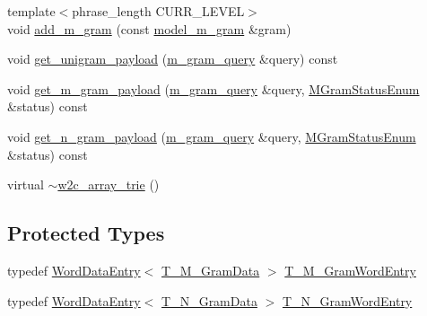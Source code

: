 \begin{DoxyCompactItemize}
\item 
{\footnotesize template$<$phrase\+\_\+length C\+U\+R\+R\+\_\+\+L\+E\+V\+E\+L$>$ }\\void \hyperlink{classuva_1_1smt_1_1bpbd_1_1server_1_1lm_1_1w2c__array__trie_aab00f9dd930f06aa41d71fa431518f5e}{add\+\_\+m\+\_\+gram} (const \hyperlink{classuva_1_1smt_1_1bpbd_1_1server_1_1lm_1_1m__grams_1_1model__m__gram}{model\+\_\+m\+\_\+gram} \&gram)
\item 
void \hyperlink{classuva_1_1smt_1_1bpbd_1_1server_1_1lm_1_1w2c__array__trie_a3c53de697d10118522efc9ef5b200d60}{get\+\_\+unigram\+\_\+payload} (\hyperlink{classuva_1_1smt_1_1bpbd_1_1server_1_1lm_1_1m__gram__query}{m\+\_\+gram\+\_\+query} \&query) const 
\item 
void \hyperlink{classuva_1_1smt_1_1bpbd_1_1server_1_1lm_1_1w2c__array__trie_ae0c12872fd7d55a68452da23bd63966f}{get\+\_\+m\+\_\+gram\+\_\+payload} (\hyperlink{classuva_1_1smt_1_1bpbd_1_1server_1_1lm_1_1m__gram__query}{m\+\_\+gram\+\_\+query} \&query, \hyperlink{namespaceuva_1_1smt_1_1bpbd_1_1server_1_1lm_ab9b3e7382b561dcb8abcd6b55e9b796a}{M\+Gram\+Status\+Enum} \&status) const 
\item 
void \hyperlink{classuva_1_1smt_1_1bpbd_1_1server_1_1lm_1_1w2c__array__trie_a98d42527dd09acc688effad51a0dba6a}{get\+\_\+n\+\_\+gram\+\_\+payload} (\hyperlink{classuva_1_1smt_1_1bpbd_1_1server_1_1lm_1_1m__gram__query}{m\+\_\+gram\+\_\+query} \&query, \hyperlink{namespaceuva_1_1smt_1_1bpbd_1_1server_1_1lm_ab9b3e7382b561dcb8abcd6b55e9b796a}{M\+Gram\+Status\+Enum} \&status) const 
\item 
virtual \hyperlink{classuva_1_1smt_1_1bpbd_1_1server_1_1lm_1_1w2c__array__trie_a52711a1b50dbe1b1bde4308ab03c3c89}{$\sim$w2c\+\_\+array\+\_\+trie} ()
\end{DoxyCompactItemize}
\subsection*{Protected Types}
\begin{DoxyCompactItemize}
\item 
typedef \hyperlink{classuva_1_1smt_1_1bpbd_1_1server_1_1lm_1_1w2c__array__trie_1_1_word_data_entry}{Word\+Data\+Entry}$<$ \hyperlink{namespaceuva_1_1smt_1_1bpbd_1_1server_1_1lm_1_1_____w2_c_array_trie_a4d413639b142daeda71cdadbf01c2b87}{T\+\_\+\+M\+\_\+\+Gram\+Data} $>$ \hyperlink{classuva_1_1smt_1_1bpbd_1_1server_1_1lm_1_1w2c__array__trie_a9b8413a947c884a2affe6f18f93e623b}{T\+\_\+\+M\+\_\+\+Gram\+Word\+Entry}
\item 
typedef \hyperlink{classuva_1_1smt_1_1bpbd_1_1server_1_1lm_1_1w2c__array__trie_1_1_word_data_entry}{Word\+Data\+Entry}$<$ \hyperlink{namespaceuva_1_1smt_1_1bpbd_1_1server_1_1lm_1_1_____w2_c_array_trie_aab5ccfad98e04de52009d53b4b55c9f1}{T\+\_\+\+N\+\_\+\+Gram\+Data} $>$ \hyperlink{classuva_1_1smt_1_1bpbd_1_1server_1_1lm_1_1w2c__array__trie_a6ebca6462f9f38f00150fec07ee2bcf9}{T\+\_\+\+N\+\_\+\+Gram\+Word\+Entry}
\end{DoxyCompactItemize}
